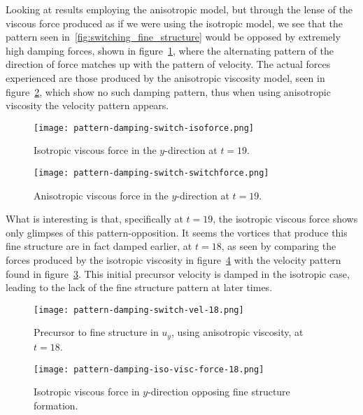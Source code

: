 Looking at results employing the anisotropic model, but through the lense of the viscous force produced as if we were using the isotropic model, we see that the pattern seen in~\ref{fig:switching_fine_structure} would be opposed by extremely high damping forces, shown in figure~\ref{fig:pattern-damping-switch-isoforce}, where the alternating pattern of the direction of force matches up with the pattern of velocity. The actual forces experienced are those produced by the anisotropic viscosity model, seen in figure~\ref{fig:pattern-damping-switch-switchforce}, which show no such damping pattern, thus when using anisotropic viscosity the velocity pattern appears.

\begin{figure}[t]
  \centering
  \texttt{[image: pattern-damping-switch-isoforce.png]}
  \caption{Isotropic viscous force in the $y$-direction at $t=19$.}
  \label{fig:pattern-damping-switch-isoforce}
\end{figure}

\begin{figure}[t]
  \centering
  \texttt{[image: pattern-damping-switch-switchforce.png]}
  \caption{Anisotropic viscous force in the $y$-direction at $t=19$.}
  \label{fig:pattern-damping-switch-switchforce}
\end{figure}

What is interesting is that, specifically at $t=19$, the isotropic viscous force shows only glimpses of this pattern-opposition. It seems the vortices that produce this fine structure are in fact damped earlier, at $t=18$, as seen by comparing the forces produced by the isotropic viscosity in figure~\ref{fig:pattern-damping-iso-visc-force-18} with the velocity pattern found in figure~\ref{fig:pattern-damping-switch-vel-18}. This initial precursor velocity is damped in the isotropic case, leading to the lack of the fine structure pattern at later times. 

\begin{figure}[t]
  \centering
  \texttt{[image: pattern-damping-switch-vel-18.png]}
  \caption{Precursor to fine structure in $u_y$, using anisotropic viscosity, at $t=18$.}
  \label{fig:pattern-damping-switch-vel-18}
\end{figure}

\begin{figure}[t]
  \centering
  \texttt{[image: pattern-damping-iso-visc-force-18.png]}
  \caption{Isotropic viscous force in $y$-direction opposing fine structure formation.}
  \label{fig:pattern-damping-iso-visc-force-18}
\end{figure}

